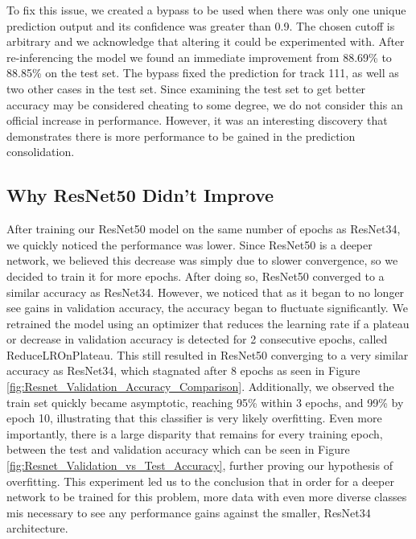 \documentclass[11pt, letterpaper]{article}
\begin{document}
To fix this issue, we created a bypass to be used when there was only one unique prediction output and its confidence was greater than 0.9. The chosen cutoff is arbitrary and we acknowledge that altering it could be experimented with. After re-inferencing the model we found an immediate improvement from 88.69\% to 88.85\% on the test set. The bypass fixed the prediction for track 111, as well as two other cases in the test set. Since examining the test set to get better accuracy may be considered cheating to some degree, we do not consider this an official increase in performance. However, it was an interesting discovery that demonstrates there is more performance to be gained in the prediction consolidation.

\subsection{Why ResNet50 Didn't Improve}

After training our ResNet50 model on the same number of epochs as ResNet34, we quickly noticed the performance was lower. Since ResNet50 is a deeper network, we believed this decrease was simply due to slower convergence, so we decided to train it for more epochs. After doing so, ResNet50 converged to a similar accuracy as ResNet34. However, we noticed that as it began to no longer see gains in validation accuracy, the accuracy began to fluctuate significantly. We retrained the model using an optimizer that reduces the learning rate if a plateau or decrease in validation accuracy is detected for 2 consecutive epochs, called ReduceLROnPlateau. This still resulted in ResNet50 converging to a very similar accuracy as ResNet34, which stagnated after 8 epochs as seen in Figure \ref{fig:Resnet_Validation_Accuracy_Comparison}. Additionally, we observed the train set quickly became asymptotic, reaching 95\% within 3 epochs, and 99\% by epoch 10, illustrating that this classifier is very likely overfitting. Even more importantly, there is a large disparity that remains for every training epoch, between the test and validation accuracy which can be seen in Figure \ref{fig:Resnet_Validation_vs_Test_Accuracy}, further proving our hypothesis of overfitting. This experiment led us to the conclusion that in order for a deeper network to be trained for this problem, more data with even more diverse classes mis necessary to see any performance gains against the smaller, ResNet34 architecture.
\end{document}
